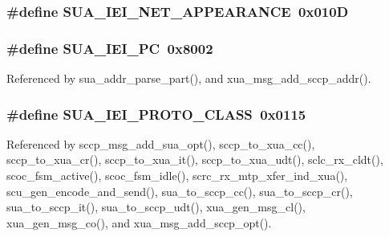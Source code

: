 \subsubsection[{S\+U\+A\+\_\+\+I\+E\+I\+\_\+\+N\+E\+T\+\_\+\+A\+P\+P\+E\+A\+R\+A\+N\+CE}]{\setlength{\rightskip}{0pt plus 5cm}\#define S\+U\+A\+\_\+\+I\+E\+I\+\_\+\+N\+E\+T\+\_\+\+A\+P\+P\+E\+A\+R\+A\+N\+CE~0x010D}\label{sua_8h_ab9523a0408f3d23ed8886c22b6da65cd}
\subsubsection[{S\+U\+A\+\_\+\+I\+E\+I\+\_\+\+PC}]{\setlength{\rightskip}{0pt plus 5cm}\#define S\+U\+A\+\_\+\+I\+E\+I\+\_\+\+PC~0x8002}\label{sua_8h_a875990b9c8cb5ea347b102d25f8f3a84}


Referenced by sua\+\_\+addr\+\_\+parse\+\_\+part(), and xua\+\_\+msg\+\_\+add\+\_\+sccp\+\_\+addr().

\subsubsection[{S\+U\+A\+\_\+\+I\+E\+I\+\_\+\+P\+R\+O\+T\+O\+\_\+\+C\+L\+A\+SS}]{\setlength{\rightskip}{0pt plus 5cm}\#define S\+U\+A\+\_\+\+I\+E\+I\+\_\+\+P\+R\+O\+T\+O\+\_\+\+C\+L\+A\+SS~0x0115}\label{sua_8h_a86ae947a3bd3ea9278349b42e91b0665}


Referenced by sccp\+\_\+msg\+\_\+add\+\_\+sua\+\_\+opt(), sccp\+\_\+to\+\_\+xua\+\_\+cc(), sccp\+\_\+to\+\_\+xua\+\_\+cr(), sccp\+\_\+to\+\_\+xua\+\_\+it(), sccp\+\_\+to\+\_\+xua\+\_\+udt(), sclc\+\_\+rx\+\_\+cldt(), scoc\+\_\+fsm\+\_\+active(), scoc\+\_\+fsm\+\_\+idle(), scrc\+\_\+rx\+\_\+mtp\+\_\+xfer\+\_\+ind\+\_\+xua(), scu\+\_\+gen\+\_\+encode\+\_\+and\+\_\+send(), sua\+\_\+to\+\_\+sccp\+\_\+cc(), sua\+\_\+to\+\_\+sccp\+\_\+cr(), sua\+\_\+to\+\_\+sccp\+\_\+it(), sua\+\_\+to\+\_\+sccp\+\_\+udt(), xua\+\_\+gen\+\_\+msg\+\_\+cl(), xua\+\_\+gen\+\_\+msg\+\_\+co(), and xua\+\_\+msg\+\_\+add\+\_\+sccp\+\_\+opt().


